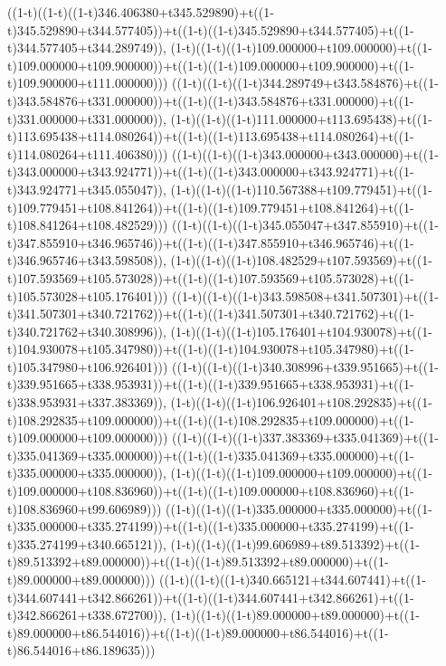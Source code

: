 ((1-t)((1-t)((1-t)346.406380+t345.529890)+t((1-t)345.529890+t344.577405))+t((1-t)((1-t)345.529890+t344.577405)+t((1-t)344.577405+t344.289749)),                                     (1-t)((1-t)((1-t)109.000000+t109.000000)+t((1-t)109.000000+t109.900000))+t((1-t)((1-t)109.000000+t109.900000)+t((1-t)109.900000+t111.000000)))
((1-t)((1-t)((1-t)344.289749+t343.584876)+t((1-t)343.584876+t331.000000))+t((1-t)((1-t)343.584876+t331.000000)+t((1-t)331.000000+t331.000000)),                                     (1-t)((1-t)((1-t)111.000000+t113.695438)+t((1-t)113.695438+t114.080264))+t((1-t)((1-t)113.695438+t114.080264)+t((1-t)114.080264+t111.406380)))
((1-t)((1-t)((1-t)343.000000+t343.000000)+t((1-t)343.000000+t343.924771))+t((1-t)((1-t)343.000000+t343.924771)+t((1-t)343.924771+t345.055047)),                                     (1-t)((1-t)((1-t)110.567388+t109.779451)+t((1-t)109.779451+t108.841264))+t((1-t)((1-t)109.779451+t108.841264)+t((1-t)108.841264+t108.482529)))
((1-t)((1-t)((1-t)345.055047+t347.855910)+t((1-t)347.855910+t346.965746))+t((1-t)((1-t)347.855910+t346.965746)+t((1-t)346.965746+t343.598508)),                                     (1-t)((1-t)((1-t)108.482529+t107.593569)+t((1-t)107.593569+t105.573028))+t((1-t)((1-t)107.593569+t105.573028)+t((1-t)105.573028+t105.176401)))
((1-t)((1-t)((1-t)343.598508+t341.507301)+t((1-t)341.507301+t340.721762))+t((1-t)((1-t)341.507301+t340.721762)+t((1-t)340.721762+t340.308996)),                                     (1-t)((1-t)((1-t)105.176401+t104.930078)+t((1-t)104.930078+t105.347980))+t((1-t)((1-t)104.930078+t105.347980)+t((1-t)105.347980+t106.926401)))
((1-t)((1-t)((1-t)340.308996+t339.951665)+t((1-t)339.951665+t338.953931))+t((1-t)((1-t)339.951665+t338.953931)+t((1-t)338.953931+t337.383369)),                                     (1-t)((1-t)((1-t)106.926401+t108.292835)+t((1-t)108.292835+t109.000000))+t((1-t)((1-t)108.292835+t109.000000)+t((1-t)109.000000+t109.000000)))
((1-t)((1-t)((1-t)337.383369+t335.041369)+t((1-t)335.041369+t335.000000))+t((1-t)((1-t)335.041369+t335.000000)+t((1-t)335.000000+t335.000000)),                                     (1-t)((1-t)((1-t)109.000000+t109.000000)+t((1-t)109.000000+t108.836960))+t((1-t)((1-t)109.000000+t108.836960)+t((1-t)108.836960+t99.606989)))
((1-t)((1-t)((1-t)335.000000+t335.000000)+t((1-t)335.000000+t335.274199))+t((1-t)((1-t)335.000000+t335.274199)+t((1-t)335.274199+t340.665121)),                                     (1-t)((1-t)((1-t)99.606989+t89.513392)+t((1-t)89.513392+t89.000000))+t((1-t)((1-t)89.513392+t89.000000)+t((1-t)89.000000+t89.000000)))
((1-t)((1-t)((1-t)340.665121+t344.607441)+t((1-t)344.607441+t342.866261))+t((1-t)((1-t)344.607441+t342.866261)+t((1-t)342.866261+t338.672700)),                                     (1-t)((1-t)((1-t)89.000000+t89.000000)+t((1-t)89.000000+t86.544016))+t((1-t)((1-t)89.000000+t86.544016)+t((1-t)86.544016+t86.189635)))
